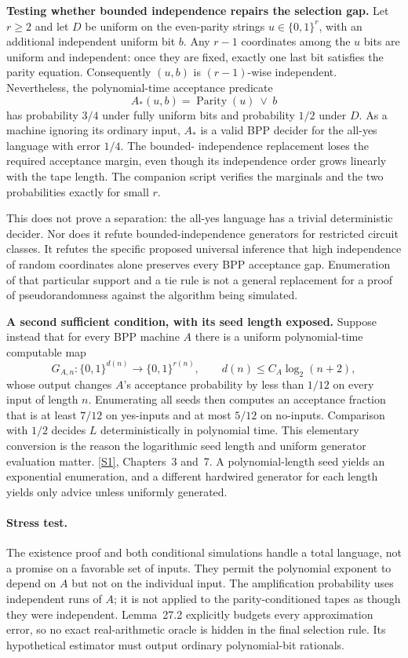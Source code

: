 \documentclass[11pt,a4paper]{article}
\newcommand{\sref}[2]{\hyperlink{source:#1:#2}{[S#2]}}
\numberwithin{equation}{section}
\begin{document}
\medskip
\textbf{Testing whether bounded independence repairs the selection gap.}
Let $r\ge2$ and let $D$ be uniform on the even-parity strings
$u\in\{0,1\}^r$, with an additional independent uniform bit $b$.
Any $r-1$ coordinates among the $u$ bits are uniform and independent:
once they are fixed, exactly one last bit satisfies the parity equation.
Consequently $(u,b)$ is $(r-1)$-wise independent. Nevertheless, the
polynomial-time acceptance predicate
\begin{equation}\label{r27:parity}
                 A_*(u,b)=\operatorname{Parity}(u)\ \lor\ b
\end{equation}
has probability $3/4$ under fully uniform bits and probability $1/2$
under $D$. As a machine ignoring its ordinary input, $A_*$ is a valid
BPP decider for the all-yes language with error $1/4$. The bounded-
independence replacement loses the required acceptance margin, even
though its independence order grows linearly with the tape length.
The companion script verifies the marginals and the two probabilities
exactly for small $r$.

This does not prove a separation: the all-yes language has a trivial
deterministic decider. Nor does it refute bounded-independence generators
for restricted circuit classes. It refutes the specific proposed
universal inference that high independence of random coordinates alone
preserves every BPP acceptance gap. Enumeration of that particular
support and a tie rule is not a general replacement for a proof of
pseudorandomness against the algorithm being simulated.

\medskip
\textbf{A second sufficient condition, with its seed length exposed.}
Suppose instead that for every BPP machine $A$ there is a uniform
polynomial-time computable map
\[
 G_{A,n}:\{0,1\}^{d(n)}\longrightarrow\{0,1\}^{r(n)},
             \qquad d(n)\le C_A\log_2(n+2),
\]
whose output changes $A$'s acceptance probability by less than $1/12$
on every input of length $n$. Enumerating all seeds then computes an
acceptance fraction that is at least $7/12$ on yes-inputs and at most
$5/12$ on no-inputs. Comparison with $1/2$ decides $L$ deterministically
in polynomial time. This elementary conversion is the reason the
logarithmic seed length and uniform generator evaluation matter.
\sref{3405}{1}, Chapters~3 and~7. A polynomial-length seed yields an
exponential enumeration, and a different hardwired generator for each
length yields only advice unless uniformly generated.

\paragraph{Stress test.}
The existence proof and both conditional simulations handle a total
language, not a promise on a favorable set of inputs. They permit the
polynomial exponent to depend on $A$ but not on the individual input.
The amplification probability uses independent runs of $A$; it is not
applied to the parity-conditioned tapes as though they were independent.
Lemma~27.2 explicitly budgets every approximation error, so no exact
real-arithmetic oracle is hidden in the final selection rule. Its
hypothetical estimator must output ordinary polynomial-bit rationals.
\end{document}
